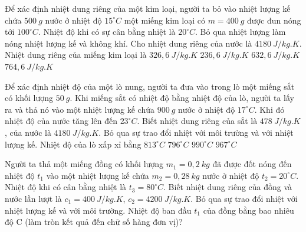\begin{ex}
	Để xác định nhiệt dung riêng của một kim loại, người ta bỏ vào nhiệt lượng kế chứa $500 \ g$ nước ở nhiệt độ $15^\circ C$ một miếng kim loại có $m=400 \ g$ được đun nóng tới $100^\circ C$. Nhiệt độ khi có sự cân bằng nhiệt là $20^\circ C$. Bỏ qua nhiệt lượng làm nóng nhiệt lượng kế và không khí. Cho nhiệt dung riêng của nước là $4180 \ J /kg.K$. Nhiệt dung riêng của miếng kim loại là
	\choice
	{\True $326,6 \ J / kg. K$}
	{$236,6 \ J / kg. K$}
	{$632,6 \ J / kg. K$}
	{$764,6 \ J / kg. K$}
	\end{ex}

\begin{ex}%
	Để xác định nhiệt độ của một lò nung, người ta đưa vào trong lò một miếng sắt có khối lượng $50\ g$. Khi miếng sắt có nhiệt độ bằng nhiệt độ của lò, người ta lấy ra và thả nó vào một nhiệt lượng kế chứa $900\ g$ nước ở nhiệt độ $17^\circ C$. Khi đó nhiệt độ của nước tăng lên đến $23^\circ C$.  Biết nhiệt dung riêng của sắt là $478\ J/kg.K$, của nước là $4180\ J/kg.K$. Bỏ qua sự trao đổi nhiệt với môi trường và với nhiệt lượng kế. Nhiệt độ của lò xấp xỉ bằng
	\choice
	{$813^\circ C$}
	{$796^\circ C$}
	{$990^\circ C$}
	{\True $967^\circ C$}
	\end{ex}
%




\begin{ex} 
	Người ta thả một miếng đồng có khối lượng $m_1=0,2\ kg$ đã được đốt nóng đến nhiệt độ $t_1$ vào một nhiệt lượng kế chứa $m_2=0,28\ kg$ nước ở nhiệt độ $t_2=20^\circ C$. Nhiệt độ khi có cân bằng nhiệt là $t_3=80^\circ C$. Biết nhiệt dung riêng của đồng và nước lần lượt là $c_1=400\ J/kg . K$, $c_2=4200\ J/kg . K$. Bỏ qua sự trao đổi nhiệt với nhiệt lượng kế và với môi trường. Nhiệt độ ban đầu $t_1$ của đồng bằng bao nhiêu độ C (làm tròn kết quả  đến chữ số hàng đơn vị)?
\end{ex}



